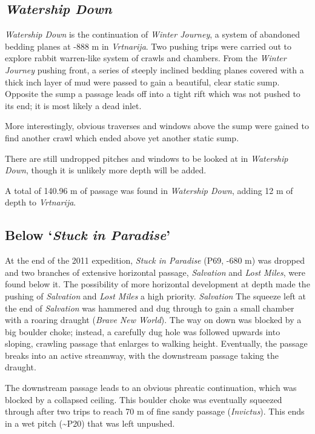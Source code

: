 \subsection{\texorpdfstring{\emph{Watership
Down}}{Watership Down}}

\emph{Watership Down} is the continuation of \emph{Winter Journey}, a
system of abandoned bedding planes at -888 m in \emph{Vrtnarija}. Two
pushing trips were carried out to explore rabbit warren-like system of
crawls and chambers. From the \emph{Winter Journey} pushing front, a
series of steeply inclined bedding planes covered with a thick inch
layer of mud were passed to gain a beautiful, clear static sump.
Opposite the sump a passage leads off into a tight rift which was not
pushed to its end; it is most likely a dead inlet.

More interestingly, obvious traverses and windows above the sump were
gained to find another crawl which ended above yet another static sump.

There are still undropped pitches and windows to be looked at in
\emph{Watership Down}, though it is unlikely more depth will be added.

A total of 140.96 m of passage was found in \emph{Watership Down},
adding 12 m of depth to \emph{Vrtnarija}.


\subsection{\texorpdfstring{Below `\emph{Stuck in
Paradise}'}{Below `Stuck in Paradise'}}

At the end of the 2011 expedition, \emph{Stuck in Paradise} (P69, -680
m) was dropped and two branches of extensive horizontal passage,
\emph{Salvation} and \emph{Lost Miles}, were found below it. The
possibility of more horizontal development at depth made the pushing of
\emph{Salvation} and \emph{Lost Miles} a high priority. \emph{Salvation}
The squeeze left at the end of \emph{Salvation} was hammered and dug
through to gain a small chamber with a roaring draught (\emph{Brave New
World}). The way on down was blocked by a big boulder choke; instead, a
carefully dug hole was followed upwards into sloping, crawling passage
that enlarges to walking height. Eventually, the passage breaks into an
active streamway, with the downstream passage taking the draught.

The downstream passage leads to an obvious phreatic continuation, which
was blocked by a collapsed ceiling. This boulder choke was eventually
squeezed through after two trips to reach 70 m of fine sandy passage
(\emph{Invictus}). This ends in a wet pitch (\textasciitilde P20) that
was left unpushed.

